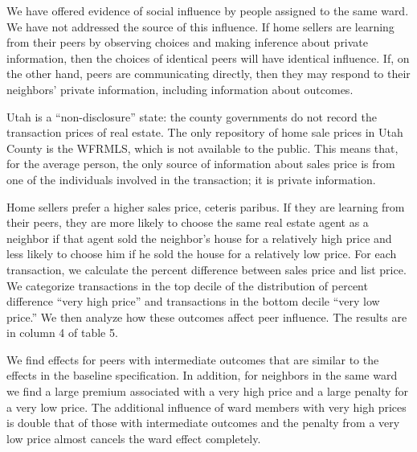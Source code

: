 \documentclass[12pt]{article}
\begin{document}
    We have offered evidence of social influence by people assigned to the same ward. We have not addressed the source of this influence. If home
    sellers are learning from their peers by observing choices and making inference about private information, then the choices of identical peers
    will have identical influence. If, on the other hand, peers are communicating directly, then they may respond to their neighbors' private
    information, including information about outcomes.

    Utah is a ``non-disclosure'' state: the county governments do not record the transaction prices of real estate. The only repository of home sale
    prices in Utah County is the WFRMLS, which is not available to the public. This means that, for the average person, the only source of information
    about sales price is from one of the individuals involved in the transaction; it is private information. 
    
    Home sellers prefer a higher sales price, ceteris paribus. If they are learning from their peers, they are more likely to choose the same real
    estate agent as a neighbor if that agent sold the neighbor's house for a relatively high price and less likely to choose him if he sold the house
    for a relatively low price. For each transaction, we calculate the percent difference between sales price and list price. We categorize
    transactions in the top decile of the distribution of percent difference ``very high price'' and transactions in the bottom decile ``very low
    price.'' We then analyze how these outcomes affect peer influence. The results are in column 4 of table 5.

    We find effects for peers with intermediate outcomes that are similar to the effects in the baseline specification. In addition, for neighbors in
    the same ward we find a large premium associated with a very high price and a large penalty for a very low price. The additional influence of ward
    members with very high prices is double that of those with intermediate outcomes and the penalty from a very low price almost cancels the ward
    effect completely.
\end{document}
